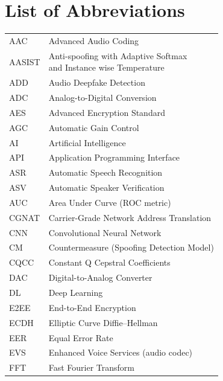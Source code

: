 \newpage
{}
\section*{List of Abbreviations}

\begin{longtable}{@{}p{5cm} p{11cm}}

AAC       & Advanced Audio Coding \\[0.2cm]
AASIST     & \parbox[t]{12cm}{
            Anti-spoofing with Adaptive Softmax\\
            and Instance wise Temperature\vspace{0.4cm}
            }\\
ADD       & Audio Deepfake Detection \\[0.2cm]
ADC       & Analog-to-Digital Conversion \\[0.2cm]
AES       & Advanced Encryption Standard \\[0.2cm]
AGC       & Automatic Gain Control \\[0.2cm]
AI        & Artificial Intelligence \\[0.2cm]
API       & Application Programming Interface \\[0.2cm]
ASR       & Automatic Speech Recognition \\[0.2cm]
ASV       & Automatic Speaker Verification \\[0.2cm]
AUC       & Area Under Curve (ROC metric) \\[0.2cm]
CGNAT     & Carrier-Grade Network Address Translation \\[0.2cm]
CNN       & Convolutional Neural Network \\[0.2cm]
CM        & Countermeasure (Spoofing Detection Model) \\[0.2cm]
CQCC      & Constant Q Cepstral Coefficients \\[0.2cm]
DAC       & Digital-to-Analog Converter \\[0.2cm]
DL        & Deep Learning \\[0.2cm]
E2EE      & End-to-End Encryption \\[0.2cm]
ECDH      & Elliptic Curve Diffie–Hellman \\[0.2cm]
EER       & Equal Error Rate \\[0.2cm]
EVS       & Enhanced Voice Services (audio codec) \\[0.2cm]
FFT       & Fast Fourier Transform \\[0.2cm]

\end{longtable}
